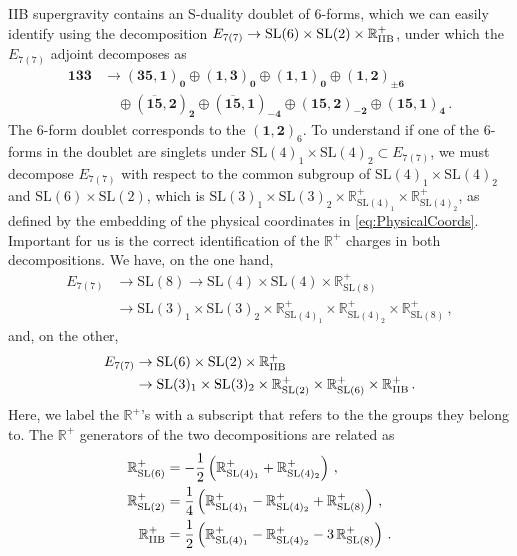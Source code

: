 \documentclass[a4paper, 11pt]{article}
\numberwithin{equation}{section}
\newcommand{\SL}[1]{\mathrm{SL}( #1 )}
\newcommand{\En}[1]{E_{#1(#1)}}
\newcommand{\+}{\oplus}
\newcommand{\RO}{\mathbb{R}^+_{\SL{4}_1}}
\newcommand{\RT}{\mathbb{R}^+_{\SL{4}_2}}
\begin{document}
IIB supergravity contains an S-duality doublet of 6-forms, which we can easily identify using the decomposition $\En{7} \rightarrow \SL{6} \times \SL{2} \times \mathbb{R}^+_{\rm IIB}$, under which the $\En{7}$ adjoint decomposes as
\begin{equation} \label{eq:AdjointSL6}
	\begin{split}
		\mathbf{133} &\rightarrow \mathbf{\left(35,1\right)_0} \oplus \mathbf{\left(1,3\right)_0} \oplus \mathbf{\left(1,1\right)_0} \oplus \mathbf{\left(1,2\right)_{\pm 6}} \\
		& \quad \oplus \mathbf{\left(\overline{15},2\right)_2} \oplus \mathbf{\left(\overline{15},1\right)_{-4}} \oplus \mathbf{\left(15,2\right)_{-2}} \oplus \mathbf{\left(15,1\right)_4} \,.
	\end{split}
\end{equation}
The 6-form doublet corresponds to the $\mathbf{\left(1,2\right)}_{6}$. To understand if one of the 6-forms in the doublet are singlets under $\SL{4}_1 \times \SL{4}_2 \subset \En{7}$, we must decompose $\En{7}$ with respect to the common subgroup of $\SL{4}_1 \times \SL{4}_2$ and $\SL{6} \times \SL{2}$, which is $\SL{3}_1 \times \SL{3}_2 \times \RO \times \RT$, as defined by the embedding of the physical coordinates in \eqref{eq:PhysicalCoords}. Important for us is the correct identification of the $\mathbb{R}^+$ charges in both decompositions. We have, on the one hand,
\begin{equation} \label{eq:SL4SL4}
	\begin{split}
		\En{7} &\rightarrow \SL{8} \rightarrow \SL{4} \times \SL{4} \times \mathbb{R}^+_{\SL{8}} \\
		&\rightarrow \SL{3}_1 \times \SL{3}_2 \times \RO \times \RT \times \mathbb{R}^+_{\SL{8}} \,,
	\end{split}
\end{equation}
and, on the other,
\begin{equation} \label{eq:SL6SL2}
	\begin{split}
		\En{7} &\rightarrow \SL{6} \times \SL{2} \times \mathbb{R}^+_{\rm IIB} \\
		&\rightarrow \SL{3}_1 \times \SL{3}_2 \times \mathbb{R}^+_{\SL{2}} \times \mathbb{R}^+_{\SL{6}} \times \mathbb{R}^+_{\rm IIB} \,.
	\end{split}
\end{equation}
Here, we label the $\mathbb{R}^+$'s with a subscript that refers to the the groups they belong to. The $\mathbb{R}^+$ generators of the two decompositions are related as
\begin{equation} \label{eq:R+charges}
	\begin{split}
		\mathbb{R}^+_{\SL{6}} &= - \frac12 \left( \RO + \RT \right) \,, \\
		\mathbb{R}^+_{\SL{2}} &= \frac14 \left( \RO - \RT + \mathbb{R}^+_{\SL{8}} \right) \,, \\
		\mathbb{R}^+_{\rm IIB} &= \frac12 \left( \RO - \RT - 3\, \mathbb{R}^+_{\SL{8}} \right) \,.
	\end{split}
\end{equation}
\end{document}
